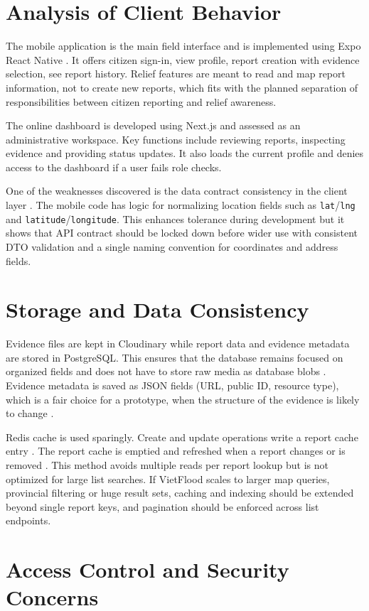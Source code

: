 \section{Analysis of Client Behavior}

The mobile application is the main field interface and is implemented using Expo React Native \cite{expoDocs,reactNativeDocs}. It offers citizen sign-in, view profile, report creation with evidence selection, see report history. Relief features are meant to read and map report information, not to create new reports, which fits with the planned separation of responsibilities between citizen reporting and relief awareness.

The online dashboard is developed using Next.js \cite{nextjsDocs} and assessed as an administrative workspace. Key functions include reviewing reports, inspecting evidence and providing status updates. It also loads the current profile and denies access to the dashboard if a user fails role checks.

One of the weaknesses discovered is the data contract consistency in the client layer . The mobile code has logic for normalizing location fields such as \texttt{lat}/\texttt{lng} and \texttt{latitude}/\texttt{longitude}. This enhances tolerance during development but it shows that API contract should be locked down before wider use with consistent DTO validation and a single naming convention for coordinates and address fields. \section{Storage and Data Consistency}

Evidence files are kept in Cloudinary while report data and evidence metadata are stored in PostgreSQL. This ensures that the database remains focused on organized fields and does not have to store raw media as database blobs \cite{cloudinaryUploadDocs}. Evidence metadata is saved as JSON fields (URL, public ID, resource type), which is a fair choice for a prototype, when the structure of the evidence is likely to change \cite{postgresqlJsonDocs}.

Redis cache is used sparingly. Create and update operations write a report cache entry . The report cache is emptied and refreshed when a report changes or is removed \cite{redisDocs}. This method avoids multiple reads per report lookup but is not optimized for large list searches. If VietFlood scales to larger map queries, provincial filtering or huge result sets, caching and indexing should be extended beyond single report keys, and pagination should be enforced across list endpoints. \section{Access Control and Security Concerns}

